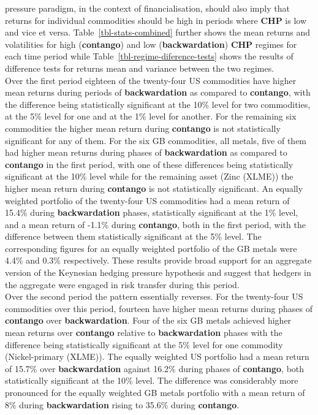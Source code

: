 \documentclass[
  authoryear,
  preprint,
  3p]{elsarticle}
\begin{document}
pressure paradigm, in the context of financialisation, should also imply
that returns for individual commodities should be high in periods where
\textbf{CHP} is low and vice et versa. Table~\ref{tbl-stats-combined}
further shows the mean returns and volatilities for high
(\textbf{contango}) and low (\textbf{backwardation}) \textbf{CHP}
regimes for each time period while
Table~\ref{tbl-regime-diference-tests} shows the results of difference
tests for returns mean and variance between the two regimes.\\
Over the first period eighteen of the twenty-four US commodities have
higher mean returns during periods of \textbf{backwardation} as compared
to \textbf{contango}, with the difference being statistically
significant at the 10\% level for two commodities, at the 5\% level for
one and at the 1\% level for another. For the remaining six commodities
the higher mean return during \textbf{contango} is not statistically
significant for any of them. For the six GB commodities, all metals,
five of them had higher mean returns during phases of
\textbf{backwardation} as compared to \textbf{contango} in the first
period, with one of these differences being statistically significant at
the 10\% level while for the remaining asset (Zinc (XLME)) the higher
mean return during \textbf{contango} is not statistically significant.
An equally weighted portfolio of the twenty-four US commodities had a
mean return of 15.4\% during \textbf{backwardation} phases,
statistically significant at the 1\% level, and a mean return of -1.1\%
during \textbf{contango}, both in the first period, with the difference
between them statistically significant at the 5\% level. The
corresponding figures for an equally weighted portfolio of the GB metals
were 4.4\% and 0.3\% respectively. These results provide broad support
for an aggregate version of the Keynesian hedging pressure hypothesis
and suggest that hedgers in the aggregate were engaged in risk transfer
during this period.\\
Over the second period the pattern essentially reverses. For the
twenty-four US commodities over this period, fourteen have higher mean
returns during phases of \textbf{contango} over \textbf{backwardation}.
Four of the six GB metals achieved higher mean returns over
\textbf{contango} relative to \textbf{backwardation} phases with the
difference being statistically significant at the 5\% level for one
commodity (Nickel-primary (XLME)). The equally weighted US portfolio had
a mean return of 15.7\% over \textbf{backwardation} against 16.2\%
during phases of \textbf{contango}, both statistically significant at
the 10\% level. The difference was considerably more pronounced for the
equally weighted GB metals portfolio with a mean return of 8\% during
\textbf{backwardation} rising to 35.6\% during \textbf{contango}.
\end{document}
